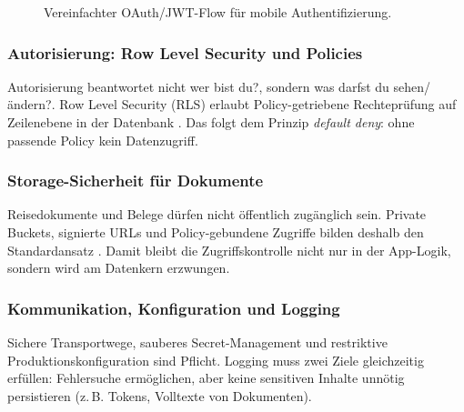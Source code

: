 \begin{figure}[H]
  \centering
  \caption{Vereinfachter OAuth/JWT-Flow für mobile Authentifizierung.}
  \label{fig:oauth_jwt_flow}
\end{figure}

\subsubsection{Autorisierung: Row Level Security und Policies}
Autorisierung beantwortet nicht \glqq wer bist du?\grqq{}, sondern
\glqq was darfst du sehen/ändern?\grqq{}. Row Level Security (RLS) erlaubt
Policy-getriebene Rechteprüfung auf Zeilenebene in der Datenbank
\cite{supabaseRLS}. Das folgt dem Prinzip \textit{default deny}: ohne passende
Policy kein Datenzugriff.

\subsubsection{Storage-Sicherheit für Dokumente}
Reisedokumente und Belege dürfen nicht öffentlich zugänglich sein.
Private Buckets, signierte URLs und Policy-gebundene Zugriffe bilden deshalb den
Standardansatz \cite{supabaseStorage}. Damit bleibt die Zugriffskontrolle nicht
nur in der App-Logik, sondern wird am Datenkern erzwungen.

\subsubsection{Kommunikation, Konfiguration und Logging}
Sichere Transportwege, sauberes Secret-Management und restriktive
Produktionskonfiguration sind Pflicht. Logging muss zwei Ziele gleichzeitig
erfüllen: Fehlersuche ermöglichen, aber keine sensitiven Inhalte unnötig
persistieren (z.\,B. Tokens, Volltexte von Dokumenten).

